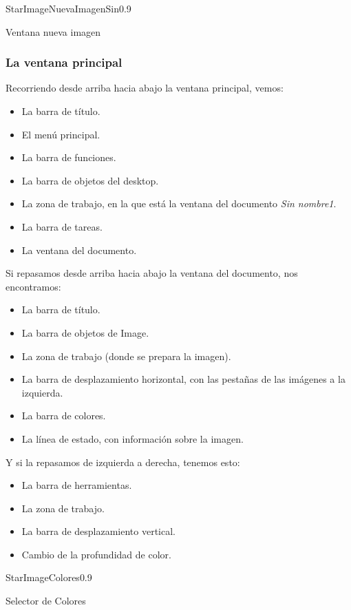 \begin{figura}{StarImageNuevaImagenSin}{0.9}
\caption{Ventana nueva imagen}
\label{fig:StarImageNuevaImagenSin}
\end{figura}


\subsubsection{La ventana principal}

Recorriendo desde arriba hacia abajo la ventana principal, vemos:
\begin{itemize}
\item La barra de título.
\item El menú principal.
\item La barra de funciones.
\item La barra de objetos del desktop.
\item La zona de trabajo, en la que está la ventana del documento {\it Sin nombre1}.
\item La barra de tareas.
\item La ventana del documento.
\end{itemize}

Si repasamos desde arriba hacia abajo la ventana del documento, nos encontramos:
\begin{itemize}
\item La barra de título.
\item La barra de objetos de Image.
\item La zona de trabajo (donde se prepara la imagen).
\item La barra de desplazamiento horizontal, con las pestañas de las imágenes a la izquierda.
\item La barra de colores.
\item La línea de estado, con información sobre la imagen.
\end{itemize}

Y si la repasamos de izquierda a derecha, tenemos esto:
\begin{itemize}
\item La barra de herramientas.
\item La zona de trabajo.
\item La barra de desplazamiento vertical.
\item Cambio de la profundidad de color.
\end{itemize}

\begin{figura}{StarImageColores}{0.9}
\caption{Selector de Colores}
\label{fig:StarImageColores}
\end{figura}


